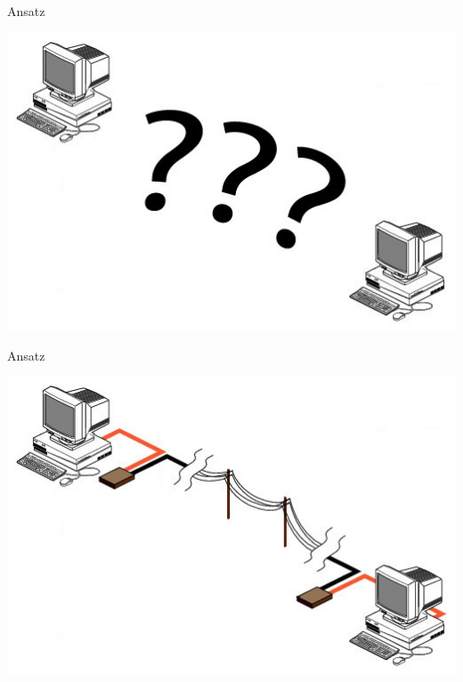 \documentclass[beamer]{uibk}
\begin{document}
\begin{frame}{Ansatz}
  \begin{center}
  \includegraphics[width=\textwidth,height=\textheight,keepaspectratio]{ansatz_2.jpg}
  \end{center}
\end{frame}

\begin{frame}{Ansatz}
  \begin{center}
  \includegraphics[width=\textwidth,height=\textheight,keepaspectratio]{ansatz_3.jpg}
  \end{center}
\end{frame}
\end{document}
